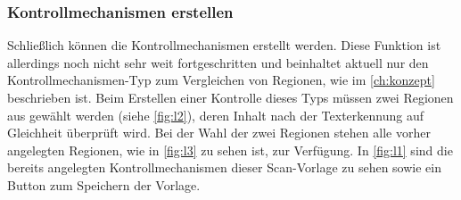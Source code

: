 \documentclass[notables, nomenclature, oneside, 150]{HSMW-Thesis}
\begin{document}
			\vspace{-5mm}
			\subsubsection*{Kontrollmechanismen erstellen}
				Schließlich können die Kontrollmechanismen erstellt werden. Diese Funktion ist allerdings noch nicht sehr weit fortgeschritten und beinhaltet aktuell nur den Kontrollmechanismen-Typ zum Vergleichen von Regionen, wie im \autoref{ch:konzept} beschrieben ist. Beim Erstellen einer Kontrolle dieses Typs müssen zwei Regionen aus gewählt werden (siehe \autoref{fig:l2}), deren Inhalt nach der Texterkennung auf Gleichheit überprüft wird. Bei der Wahl der zwei Regionen stehen alle vorher angelegten Regionen, wie in \autoref{fig:l3} zu sehen ist, zur Verfügung. In \autoref{fig:l1} sind die bereits angelegten Kontrollmechanismen dieser Scan-Vorlage zu sehen sowie ein Button zum Speichern der Vorlage.
				
\end{document}
